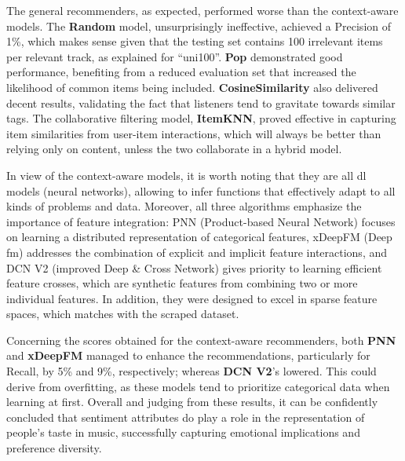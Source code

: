 The general recommenders, as expected, performed worse than the context-aware models. The \textbf{Random} model, unsurprisingly ineffective, achieved a Precision of 1\%, which makes sense given that the testing set contains 100 irrelevant items per relevant track, as explained for ``uni100''. \textbf{Pop} demonstrated good performance, benefiting from a reduced evaluation set that increased the likelihood of common items being included. \textbf{CosineSimilarity} also delivered decent results, validating the fact that listeners tend to gravitate towards similar tags. The collaborative filtering model, \textbf{ItemKNN}, proved effective in capturing item similarities from user-item interactions, which will always be better than relying only on content, unless the two collaborate in a hybrid model.

In view of the context-aware models, it is worth noting that they are all \acl{dl} models (neural networks), allowing to infer functions that effectively adapt to all kinds of problems and data. Moreover, all three algorithms emphasize the importance of feature integration: PNN (Product-based Neural Network) focuses on learning a distributed representation of categorical features, xDeepFM (Deep \acl{fm}) addresses the combination of explicit and implicit feature interactions, and DCN V2 (improved Deep \& Cross Network) gives priority to learning efficient feature crosses, which are synthetic features from combining two or more individual features. In addition, they were designed to excel in sparse feature spaces, which matches with the scraped dataset.

Concerning the scores obtained for the context-aware recommenders, both \textbf{PNN} and \textbf{xDeepFM} managed to enhance the recommendations, particularly for Recall, by 5\% and 9\%, respectively; whereas \textbf{DCN V2}'s lowered. This could derive from overfitting, as these models tend to prioritize categorical data when learning at first. Overall and judging from these results, it can be confidently concluded that sentiment attributes do play a role in the representation of people's taste in music, successfully capturing emotional implications and preference diversity.